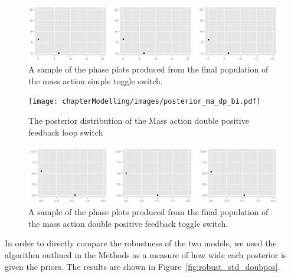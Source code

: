 \begin{figure}[p]
\centering
\includegraphics[scale=0.3]{chapterModelling/images/ma_cl_bi_phase_plot.png}
\caption{A sample of the phase plots produced from the final population of the mass action simple toggle switch.}
\label{fig:det_std_phase}
\end{figure}

\begin{figure}[p]
\centering
\texttt{[image: chapterModelling/images/posterior\_ma\_dp\_bi.pdf]}
\caption{The posterior distribution of the Mass action double positive feedback loop switch}
\label{fig:doub_pos}
\end{figure}

\begin{figure}[p]
\centering
\includegraphics[scale=0.3]{chapterModelling/images/ma_dp_bi_phase_plot.png}
\caption{A sample of the phase plots produced from the final population of the mass action double positive feedback toggle switch.}
\label{fig:det_dp_phase}
\end{figure}
\clearpage
In order to directly compare the robustness of the two models, we used the algorithm outlined in the Methods as a measure of how wide each posterior is given the priors. The results are shown in Figure~\ref{fig:robust_std_doubpos}. 


